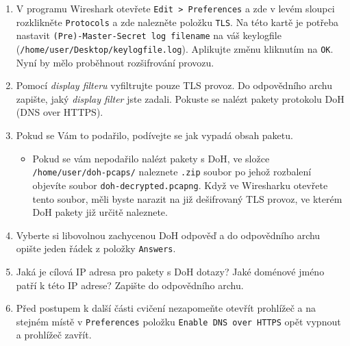 \begin{enumerate}
    \item V programu Wireshark otevřete \texttt{Edit > Preferences} a zde v levém sloupci rozklikněte \texttt{Protocols} a zde nalezněte položku \texttt{TLS}. Na této kartě je potřeba nastavit \texttt{(Pre)-Master-Secret log filename} na váš keylogfile (\texttt{/home/user/Desktop/keylogfile.log}). Aplikujte změnu kliknutím na \texttt{OK}. Nyní by mělo proběhnout rozšifrování provozu.
    \item Pomocí \emph{display filteru} vyfiltrujte pouze TLS provoz. Do odpovědního archu zapište, jaký \emph{display filter} jste zadali. Pokuste se nalézt pakety protokolu DoH (DNS over HTTPS).
    \item Pokud se Vám to podařilo, podívejte se jak vypadá obsah paketu.
    \begin{itemize}
        \item Pokud se vám nepodařilo nalézt pakety s DoH, ve složce \texttt{/home/user/doh-pcaps/} naleznete \texttt{.zip} soubor po jehož rozbalení objevíte soubor \texttt{doh-decrypted.pcapng}.
		Když ve Wiresharku otevřete tento soubor, měli byste narazit na již dešifrovaný TLS provoz, ve kterém DoH pakety již určitě naleznete.
    \end{itemize}
	\item Vyberte si libovolnou zachycenou DoH odpověď a do odpovědního archu opište jeden řádek z položky \texttt{Answers}.
	\item Jaká je cílová IP adresa pro pakety s DoH dotazy? Jaké doménové jméno patří k této IP adrese? Zapište do odpovědního archu.
    \item Před postupem k další části cvičení nezapomeňte otevřít prohlížeč a na stejném místě v \texttt{Preferences} položku \texttt{Enable DNS over HTTPS} opět vypnout a prohlížeč zavřít.
\end{enumerate}


